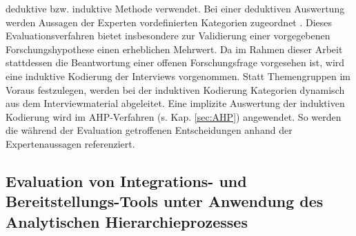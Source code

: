 deduktive bzw. induktive Methode verwendet. Bei einer deduktiven Auswertung werden Aussagen der Experten vordefinierten Kategorien zugeordnet \cite[244 ff.]{Hildebrandt.2015}. Dieses Evaluationsverfahren bietet insbesondere zur Validierung einer vorgegebenen Forschungshypothese einen erheblichen Mehrwert. Da im Rahmen dieser Arbeit stattdessen die Beantwortung einer offenen Forschungsfrage vorgesehen ist, wird eine induktive Kodierung der Interviews vorgenommen. Statt Themengruppen im Voraus festzulegen, werden bei der induktiven Kodierung Kategorien dynamisch aus dem Interviewmaterial abgeleitet. Eine implizite Auswertung der induktiven Kodierung wird im AHP-Verfahren (s. Kap. \ref*{sec:AHP}) angewendet. So werden die während der Evaluation getroffenen Entscheidungen anhand der Expertenaussagen referenziert.

\subsection{Evaluation von Integrations- und Bereitstellungs-Tools unter Anwendung des Analytischen Hierarchieprozesses}
\label{sec:meth_ahp}
